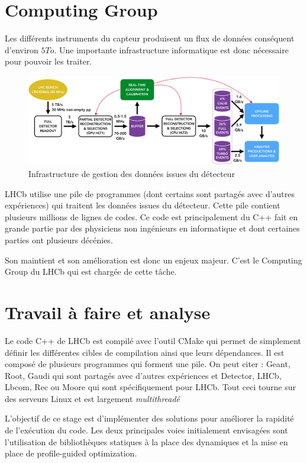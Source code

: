 \documentclass[a4paper]{report}
\begin{document}
    \section{Computing Group}
        Les différents instruments du capteur produisent un flux de données conséquent d'environ $5 To$.
        Une importante infrastructure informatique est donc nécessaire pour pouvoir les traiter.

        \begin{figure}[!htb]
            \includegraphics[width=\textwidth, center]{LHCb_stack.png}
            \caption{Infrastructure de gestion des données issues du détecteur}
            \label{LHCb_stack}
        \end{figure}

        LHCb utilise une pile de programmes (dont certains sont partagés avec d'autres expériences) qui traitent les données issues du détecteur.
        Cette pile contient plusieurs millions de lignes de codes.
        Ce code est principalement du C++ fait en grande partie par des physiciens non ingénieurs en informatique et dont certaines parties ont plusieurs décénies.

        Son maintient et son amélioration est donc un enjeux majeur.
        C'est le Computing Group du LHCb qui est chargée de cette tâche.

    \section{Travail à faire et analyse}
        Le code C++ de LHCb est compilé avec l'outil CMake qui permet de simplement définir les différentes cibles de compilation ainsi que leurs dépendances.
        Il est composé de plusieurs programmes qui forment une pile.
        On peut citer : Geant, Root, Gaudi qui sont partagés avec d'autres expériences et Detector, LHCb, Lbcom, Rec ou Moore qui sont spécifiquement pour LHCb.
        Tout ceci tourne sur des serveurs Linux et est largement \emph{multithreadé}

        L'objectif de ce stage est d'implémenter des solutions pour améliorer la rapidité de l'exécution du code.
        Les deux principales voies initialement envisagées sont l'utilisation de bibliothèques statiques à la place des dynamiques et la mise en place de profile-guided optimization.
\end{document}
